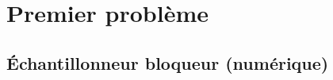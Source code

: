 \documentclass[a4paper,french,bookmarks]{article}
\begin{document}
    \renewcommand{\thesection}{\Roman{section}} 
    \renewcommand{\thesubsection}{\thesection.\Alph{subsection}}
    \renewcommand{\labelenumi}{\thesection.\arabic{enumi}.}
    \renewcommand*{\labelenumii}{\thesection.\arabic{enumi}.\alph{enumii}.}
    
    
    \section{Premier problème}
    
    \subsection{Échantillonneur bloqueur (numérique)}
    
\end{document}
